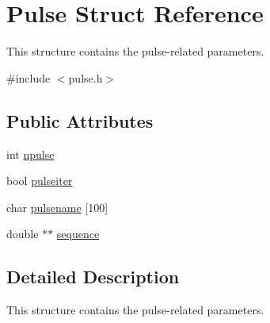 \hypertarget{structPulse}{\section{Pulse Struct Reference}
\label{structPulse}
}


This structure contains the pulse-\/related parameters.  




{\ttfamily \#include $<$pulse.\-h$>$}

\subsection*{Public Attributes}
\begin{DoxyCompactItemize}
\item 
int \hyperlink{structPulse_ab083ce764799722049dac44ad7479bad}{npulse}
\item 
bool \hyperlink{structPulse_a4fcad551982a417a36f160cd0a6f0975}{pulseiter}
\item 
char \hyperlink{structPulse_a94ae332f008b81e37d8df344a3c7d9b7}{pulsename} \mbox{[}100\mbox{]}
\item 
double $\ast$$\ast$ \hyperlink{structPulse_af1bd05f903769ac217b18fb0c2ebc31a}{sequence}
\end{DoxyCompactItemize}


\subsection{Detailed Description}
This structure contains the pulse-\/related parameters. 

